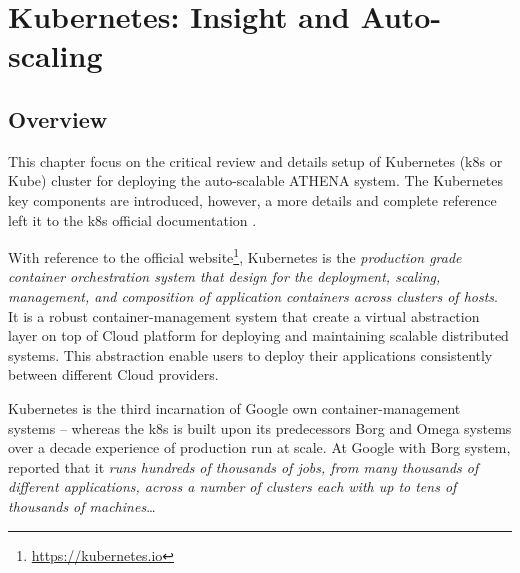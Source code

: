 \chapter{Kubernetes: Insight and Auto-scaling}

\label{Chapter4} 

\section{Overview}

This chapter focus on the critical review and details setup of Kubernetes (k8s or Kube) cluster for deploying the auto-scalable ATHENA system. The Kubernetes key components are introduced, however, a more details and complete reference left it to the k8s official documentation \parencite{kubeDoc}.

With reference to the official website\footnote{\url{https://kubernetes.io}}, Kubernetes is the \emph{production grade container orchestration system that design for the deployment, scaling, management, and composition of application containers across clusters of hosts}. It is a robust container-management system that create a virtual abstraction layer on top of Cloud platform for deploying and maintaining scalable distributed systems. This abstraction enable users to deploy their applications consistently between different Cloud providers.


Kubernetes is the third incarnation of Google own container-management systems -- whereas the k8s is built upon its predecessors Borg and Omega \parencite{44843} systems over a decade experience of production run at scale. At Google with Borg system, \parencite{43438} reported that it \emph{runs hundreds of thousands of jobs, from many thousands of different applications, across a number of clusters each with up to tens of thousands of machines}\ldots



